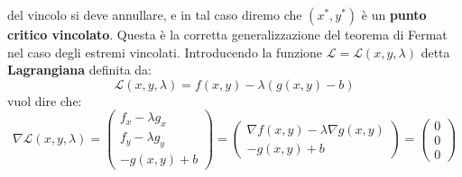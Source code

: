 \documentclass[a4paper]{article}
\numberwithin{equation}{subsection}
\begin{document}
del vincolo si deve annullare, e in tal caso diremo che $(x^\ast, y^\ast)$ è un \textbf{punto critico vincolato}.
Questa è la corretta generalizzazione del teorema di Fermat nel caso degli estremi vincolati.
Introducendo la funzione $\mathcal{L} = \mathcal{L}(x,y,\lambda)$ detta \textbf{Lagrangiana} definita da:
\[\mathcal{L}(x,y,\lambda) = f(x,y) - \lambda(g(x,y)-b)\]
vuol dire che:
\[\nabla \mathcal{L}(x,y,\lambda) = \begin{pmatrix}
    f_x - \lambda g_x\\
    f_y - \lambda g_y\\
    -g(x,y) + b
\end{pmatrix} = \begin{pmatrix}
    \nabla f(x,y) - \lambda \nabla g(x,y)\\
    - g(x,y) + b
\end{pmatrix} = \begin{pmatrix}
    0\\
    0\\
    0
\end{pmatrix}\]
\ex{}
\end{document}
